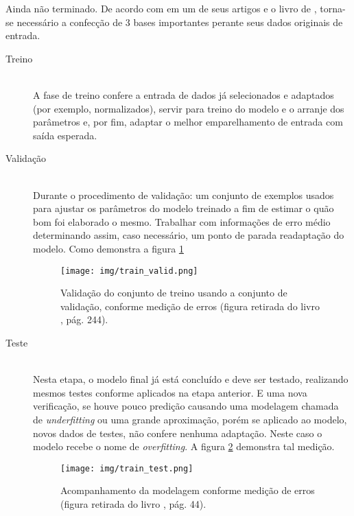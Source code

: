 \documentclass[journal]{IEEEtran}
\begin{document}
Ainda não terminado. De acordo com \citeauthor{Ng97preventing_overfitting} em um de seus artigos \cite{Ng97preventing_overfitting} e o livro de \citeauthor{hastie2009elements} \cite{hastie2009elements}, torna-se necessário a confecção de 3 bases importantes perante seus dados originais de entrada.

\begin{description}
  
  \item[Treino] \hfill \\
  A fase de treino confere a entrada de dados já selecionados e adaptados (por exemplo, normalizados), servir para treino do modelo e o arranje dos parâmetros e, por fim, adaptar o melhor emparelhamento de entrada com saída esperada.
  
  \item[Validação] \hfill \\
  Durante o procedimento de validação: um conjunto de exemplos usados para ajustar os parâmetros do modelo treinado a fim de estimar o quão bom foi elaborado o mesmo. Trabalhar com informações de erro médio determinando assim, caso necessário, um ponto de parada readaptação do modelo. Como demonstra a figura \ref{fig:train_valid}
  
    \begin{figure}[h]
    \captionsetup{justification=centering}
    \centering
    \texttt{[image: img/train\_valid.png]} %
    \caption{\small{Validação do conjunto de treino usando a conjunto de validação, conforme medição de erros (figura retirada do livro \cite{hastie2009elements}, pág. 244).}}
    \label{fig:train_valid}
    \end{figure}
  
  \item[Teste] \hfill \\
  Nesta etapa, o modelo final já está concluído e deve ser testado, realizando mesmos testes conforme aplicados na etapa anterior. E uma nova verificação, se houve pouco predição causando uma modelagem chamada de \textit{underfitting} ou uma grande aproximação, porém se aplicado ao modelo, novos dados de testes, não confere nenhuma adaptação. Neste caso o modelo recebe o nome de \textit{overfitting}. A figura \ref{fig:train_test} demonstra tal medição.
  
    \begin{figure}[h]
    \captionsetup{justification=centering}
    \centering
    \texttt{[image: img/train\_test.png]} %
    \caption{\small{Acompanhamento da modelagem conforme medição de erros (figura retirada do livro \cite{hastie2009elements}, pág. 44).}}
    \label{fig:train_test}
    \end{figure}
    

\end{description}
\end{document}

